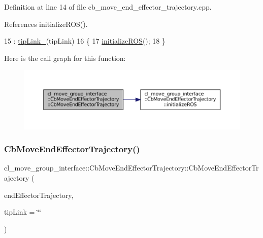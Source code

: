 Definition at line 14 of file cb\+\_\+move\+\_\+end\+\_\+effector\+\_\+trajectory.\+cpp.



References initialize\+R\+O\+S().


\begin{DoxyCode}
15         : \hyperlink{classcl__move__group__interface_1_1CbMoveEndEffectorTrajectory_a24c6c30b9b0761a61fa002d947bd3e11}{tipLink\_}(tipLink)
16     \{
17         \hyperlink{classcl__move__group__interface_1_1CbMoveEndEffectorTrajectory_afcee8f3853a5cef8806137a304c8a14b}{initializeROS}();
18     \}
\end{DoxyCode}
Here is the call graph for this function\+:
\nopagebreak
\begin{figure}[H]
\begin{center}
\leavevmode
\includegraphics[width=350pt]{classcl__move__group__interface_1_1CbMoveEndEffectorTrajectory_af7e718b0c53e912fd74968abbb0a4810_cgraph}
\end{center}
\end{figure}
\mbox{\label{classcl__move__group__interface_1_1CbMoveEndEffectorTrajectory_ae6985de3f8f0e1ec7dea88c1e551889a}} 
\subsubsection{\texorpdfstring{Cb\+Move\+End\+Effector\+Trajectory()}{CbMoveEndEffectorTrajectory()}\hspace{0.1cm}{\footnotesize\ttfamily [2/2]}}
{\footnotesize\ttfamily cl\+\_\+move\+\_\+group\+\_\+interface\+::\+Cb\+Move\+End\+Effector\+Trajectory\+::\+Cb\+Move\+End\+Effector\+Trajectory (\begin{DoxyParamCaption}\item[{const std\+::vector$<$ geometry\+\_\+msgs\+::\+Pose\+Stamped $>$ \&}]{end\+Effector\+Trajectory,  }\item[{std\+::string}]{tip\+Link = {\ttfamily \char`\"{}\char`\"{}} }\end{DoxyParamCaption})}



